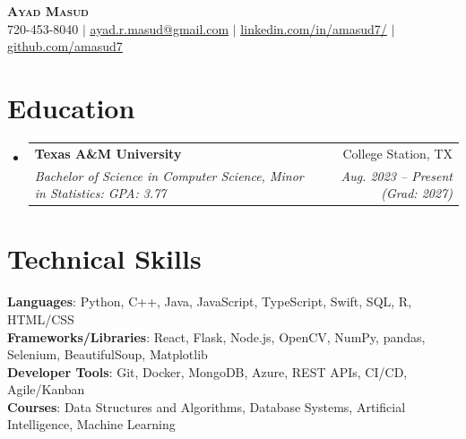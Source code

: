\documentclass[letterpaper,10pt]{article}
\makeatletter
\newcommand{\resumeSubheading}[4]{
  \vspace{-2pt}\item
    \begin{tabular*}{0.97\textwidth}[t]{l@{\extracolsep{\fill}}r}
      \textbf{#1} & #2 \\
      \textit{\small#3} & \textit{\small #4} \\
    \end{tabular*}\vspace{-7pt}
}
\newcommand{\resumeSubHeadingListStart}{\begin{itemize}[leftmargin=0.15in, label={}, itemsep=-2pt]}
\newcommand{\resumeSubHeadingListEnd}{\end{itemize}}
\makeatother
\begin{document}

\begin{center}
    \textbf{\Huge \scshape Ayad Masud} \\ \vspace{1pt}
    \small 720-453-8040 $|$ \href{mailto:ayad.r.masud@gmail.com}{\underline{ayad.r.masud@gmail.com}} $|$ 
    \href{https://linkedin.com/in/amasud7}{\underline{linkedin.com/in/amasud7/}} $|$
    \href{https://github.com/amasud7}{\underline{github.com/amasud7}}
\end{center}


\section{Education}
  \resumeSubHeadingListStart
    \resumeSubheading
      {Texas A\&M University}{College Station, TX}
      {Bachelor of Science in Computer Science, Minor in Statistics: GPA: 3.77}{Aug. 2023 -- Present (Grad: 2027)}
  \resumeSubHeadingListEnd


\section{Technical Skills}
\begin{itemize}[leftmargin=0.15in, label={}]
   \small{\item{
    \textbf{Languages}{: Python, C++, Java, JavaScript, TypeScript, Swift, SQL, R, HTML/CSS} \\
    \textbf{Frameworks/Libraries}{: React, Flask, Node.js, OpenCV, NumPy, pandas, Selenium, BeautifulSoup, Matplotlib} \\
    \textbf{Developer Tools}{: Git, Docker, MongoDB, Azure, REST APIs, CI/CD, Agile/Kanban} \\
    \textbf{Courses}{: Data Structures and Algorithms, Database Systems, Artificial Intelligence, Machine Learning}
   }}
\end{itemize}
\end{document}
